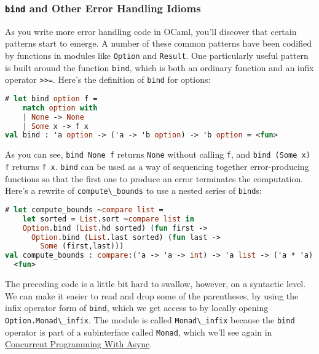 \hypertarget{bind-and-other-error-handling-idioms}{%
\subsubsection{\texorpdfstring{\texttt{bind} and Other Error Handling
Idioms}{bind and Other Error Handling Idioms}}\label{bind-and-other-error-handling-idioms}}

As you write more error handling code in OCaml, you'll discover that
certain patterns start to emerge. A number of these common patterns have
been codified by functions in modules like
\passthrough{\lstinline!Option!} and \passthrough{\lstinline!Result!}.
One particularly useful pattern is built around the function
\passthrough{\lstinline!bind!}, which is both an ordinary function and
an infix operator \passthrough{\lstinline!>>=!}. Here's the definition
of \passthrough{\lstinline!bind!} for options: 

\begin{lstlisting}[language=Caml]
# let bind option f =
    match option with
    | None -> None
    | Some x -> f x
val bind : 'a option -> ('a -> 'b option) -> 'b option = <fun>
\end{lstlisting}

As you can see, \passthrough{\lstinline!bind None f!} returns
\passthrough{\lstinline!None!} without calling
\passthrough{\lstinline!f!}, and
\passthrough{\lstinline!bind (Some x) f!} returns
\passthrough{\lstinline!f x!}. \passthrough{\lstinline!bind!} can be
used as a way of sequencing together error-producing functions so that
the first one to produce an error terminates the computation. Here's a
rewrite of \passthrough{\lstinline!compute\_bounds!} to use a nested
series of \passthrough{\lstinline!bind!}s:

\begin{lstlisting}[language=Caml]
# let compute_bounds ~compare list =
    let sorted = List.sort ~compare list in
    Option.bind (List.hd sorted) (fun first ->
      Option.bind (List.last sorted) (fun last ->
        Some (first,last)))
val compute_bounds : compare:('a -> 'a -> int) -> 'a list -> ('a * 'a) option =
  <fun>
\end{lstlisting}

The preceding code is a little bit hard to swallow, however, on a
syntactic level. We can make it easier to read and drop some of the
parentheses, by using the infix operator form of
\passthrough{\lstinline!bind!}, which we get access to by locally
opening \passthrough{\lstinline!Option.Monad\_infix!}. The module is
called \passthrough{\lstinline!Monad\_infix!} because the
\passthrough{\lstinline!bind!} operator is part of a subinterface called
\passthrough{\lstinline!Monad!}, which we'll see again in
\href{concurrent-programming.html\#concurrent-programming-with-async}{Concurrent
Programming With Async}.

